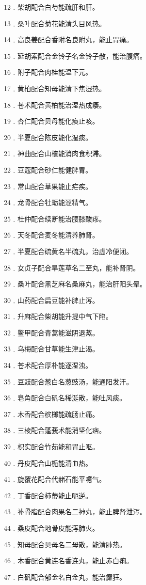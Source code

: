 \documentclass[a4paper,12pt,UTF8,twoside]{ctexbook}
\begin{document}
12﹒柴胡配合白芍能疏肝和肝。

13﹒桑叶配合菊花能清头目风热。

14﹒高良姜配合香附名良附丸，能止胃痛。

15﹒延胡索配合金铃子名金铃子散，能治腹痛。

16﹒附子配合肉桂能温下元。

17﹒黄柏配合知母能清下焦湿热。

18﹒苍术配合黄柏能治湿热成痿。

19﹒杏仁配合贝母能化痰止咳。

20﹒半夏配合陈皮能化湿痰。

21﹒神曲配合山楂能消肉食积滞。

22﹒豆蔻配合砂仁能健脾胃。

23﹒常山配合草果能止疟疾。

24﹒龙骨配合牡蛎能涩精气。

25﹒杜仲配合续断能治腰膝酸疼。

26﹒天冬配合麦冬能清养肺肾。

27﹒半夏配合硫黄名半硫丸，治虚冷便闭。

28﹒女贞子配合旱莲草名二至丸，能补肾阴。

29﹒桑叶配合黑芝麻名桑麻丸，能治肝阳头晕。

30﹒山药配合扁豆能补脾止泻。

31﹒升麻配合柴胡能升提中气下陷。

32﹒鳖甲配合青蒿能滋阴退蒸。

33﹒乌梅配合甘草能生津止渴。

34﹒苍术配合厚朴能逐湿浊。

35﹒豆豉配合葱白名葱豉汤，能通阳发汗。

36﹒皂角配合白矾名稀涎散，能吐风痰。

37﹒木香配合槟榔能疏肠止痛。

38﹒三棱配合蓬莪术能消坚化痞。

39﹒枳实配合竹茹能和胃止呕。

40﹒丹皮配合山栀能清血热。

41﹒旋覆花配合代赭石能平噫气。

42﹒丁香配合柿蒂能止呃逆。

43﹒补骨脂配合肉果名二神丸，能止脾肾泄泻。

44﹒桑皮配合地骨皮能泻肺火。

45﹒知母配合贝母名二母散，能清肺热。

46﹒木香配合黄连名香连丸，能止赤白痢。

47﹒白矾配合郁金名白金丸，能治癫狂。
\end{document}
